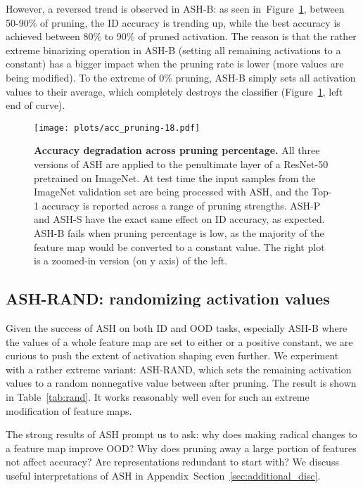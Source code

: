 \documentclass{article}
\newcommand{\figlabel}[1]{\label{fig:#1}}
\newcommand{\figref}[1]{Figure~\ref{fig:#1}}
\newcommand{\secref}[1]{Section~\ref{sec:#1}}
\newcommand{\tabref}[1]{Table~\ref{tab:#1}}
\begin{document}
However, a reversed trend is observed in ASH-B: as seen in~\figref{accdeg}, between 50-90\% of pruning, the ID accuracy is trending up, while the best accuracy is achieved between 80\% to 90\% of pruned activation. 
The reason is that the rather extreme binarizing operation in ASH-B (setting all remaining activations to a constant) has a bigger impact when the pruning rate is lower (more values are being modified). To the extreme of 0\% pruning, ASH-B simply sets all activation values to their average, which completely destroys the classifier (\figref{accdeg}, left end of curve).



\begin{figure}[hbt!]
    \centering 
	\texttt{[image: plots/acc\_pruning-18.pdf]}
	
	\caption{\textbf{Accuracy degradation across pruning percentage.} All three versions of ASH are applied to the penultimate layer of a ResNet-50 pretrained on ImageNet. At test time the input samples from the ImageNet validation set are being processed with ASH, and the Top-1 accuracy is reported across a range of pruning strengths. ASH-P and ASH-S have the exact same effect on ID accuracy, as expected. ASH-B fails when pruning percentage is low, as the majority of the feature map would be converted to a constant value. The right plot is a zoomed-in version (on y axis) of the left.}
	\figlabel{accdeg}
\end{figure}







\subsection{ASH-RAND: randomizing activation values}

Given the success of ASH on both ID and OOD tasks, especially ASH-B where the values of a whole feature map are set to either  or a positive constant, we are curious to push the extent of activation shaping even further. We experiment with a rather extreme variant: ASH-RAND, which sets the remaining activation values to a random nonnegative value between  after pruning. The result is shown in \tabref{rand}. It works reasonably well even for such an extreme modification of feature maps.

The strong results of ASH prompt us to ask: why does making radical changes to a feature map improve OOD? Why does pruning away a large portion of features not affect accuracy? Are representations redundant to start with? We discuss useful interpretations of ASH in Appendix~\secref{additional_disc}. 
\end{document}
